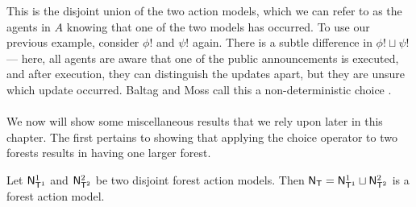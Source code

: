 This is the disjoint union of the two action models, which we can refer to as the agents in $A$
knowing that one of the two models has occurred.
To use our previous example, consider $\phi!$ and $\psi!$ again.
There is a subtle difference in $\phi! \sqcup \psi!$ --- here, all agents are aware that one of the
public announcements is executed, and after execution, they can distinguish the updates apart, but
they are unsure which update occurred.
Baltag and Moss call this a non-deterministic choice \cite{baltag2005programs}.\\
\\
We now will show some miscellaneous results that we rely upon later in this chapter.
The first pertains to showing that applying the choice operator to two forests results in having one
larger forest.

\begin{lemma} \label{disjForestIsForest}
Let $\mathrm{\mathsf{N}}^1_{\mathrm{\mathsf{T}}^1}$ and $\mathrm{\mathsf{N}}^2_{\mathrm{\mathsf{T}}^2}$ be two disjoint forest action models.
Then $\mathrm{\mathsf{N}}_\mathrm{\mathsf{T}} = \mathrm{\mathsf{N}}^1_{\mathrm{\mathsf{T}}^1} \sqcup \mathrm{\mathsf{N}}^2_{\mathrm{\mathsf{T}}^2}$ is a forest action model.
\end{lemma}

